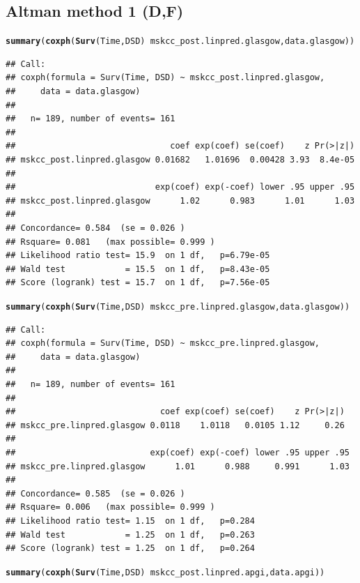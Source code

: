 \documentclass{article}\usepackage[]{graphicx}\usepackage[]{color}
\makeatletter
\newcommand{\hlopt}[1]{\textcolor[rgb]{0,0,0}{#1}}%
\newcommand{\hlstd}[1]{\textcolor[rgb]{0.345,0.345,0.345}{#1}}%
\newcommand{\hlkwd}[1]{\textcolor[rgb]{0.737,0.353,0.396}{\textbf{#1}}}%
\newenvironment{kframe}{%
 \def\at@end@of@kframe{}%
 \ifinner\ifhmode%
  \def\at@end@of@kframe{\end{minipage}}%
  \begin{minipage}{\columnwidth}%
 \fi\fi%
 \def\FrameCommand##1{\hskip\@totalleftmargin \hskip-\fboxsep
 \colorbox{shadecolor}{##1}\hskip-\fboxsep
     \hskip-\linewidth \hskip-\@totalleftmargin \hskip\columnwidth}%
 \MakeFramed {\advance\hsize-\width
   \@totalleftmargin\z@ \linewidth\hsize
   \@setminipage}}%
 {\par\unskip\endMakeFramed%
 \at@end@of@kframe}
\newenvironment{knitrout}{}{} %
\makeatother
\begin{document}
\subsection{Altman method 1 (D,F)}
\begin{knitrout}
\color{fgcolor}\begin{kframe}
\begin{alltt}
\hlkwd{summary}\hlstd{(}\hlkwd{coxph}\hlstd{(}\hlkwd{Surv}\hlstd{(Time, DSD)} \hlopt{~} \hlstd{mskcc_post.linpred.glasgow, data.glasgow))}
\end{alltt}
\begin{verbatim}
## Call:
## coxph(formula = Surv(Time, DSD) ~ mskcc_post.linpred.glasgow, 
##     data = data.glasgow)
## 
##   n= 189, number of events= 161 
## 
##                               coef exp(coef) se(coef)    z Pr(>|z|)
## mskcc_post.linpred.glasgow 0.01682   1.01696  0.00428 3.93  8.4e-05
## 
##                            exp(coef) exp(-coef) lower .95 upper .95
## mskcc_post.linpred.glasgow      1.02      0.983      1.01      1.03
## 
## Concordance= 0.584  (se = 0.026 )
## Rsquare= 0.081   (max possible= 0.999 )
## Likelihood ratio test= 15.9  on 1 df,   p=6.79e-05
## Wald test            = 15.5  on 1 df,   p=8.43e-05
## Score (logrank) test = 15.7  on 1 df,   p=7.56e-05
\end{verbatim}
\begin{alltt}
\hlkwd{summary}\hlstd{(}\hlkwd{coxph}\hlstd{(}\hlkwd{Surv}\hlstd{(Time, DSD)} \hlopt{~} \hlstd{mskcc_pre.linpred.glasgow, data.glasgow))}
\end{alltt}
\begin{verbatim}
## Call:
## coxph(formula = Surv(Time, DSD) ~ mskcc_pre.linpred.glasgow, 
##     data = data.glasgow)
## 
##   n= 189, number of events= 161 
## 
##                             coef exp(coef) se(coef)    z Pr(>|z|)
## mskcc_pre.linpred.glasgow 0.0118    1.0118   0.0105 1.12     0.26
## 
##                           exp(coef) exp(-coef) lower .95 upper .95
## mskcc_pre.linpred.glasgow      1.01      0.988     0.991      1.03
## 
## Concordance= 0.585  (se = 0.026 )
## Rsquare= 0.006   (max possible= 0.999 )
## Likelihood ratio test= 1.15  on 1 df,   p=0.284
## Wald test            = 1.25  on 1 df,   p=0.263
## Score (logrank) test = 1.25  on 1 df,   p=0.264
\end{verbatim}
\begin{alltt}
\hlkwd{summary}\hlstd{(}\hlkwd{coxph}\hlstd{(}\hlkwd{Surv}\hlstd{(Time, DSD)} \hlopt{~} \hlstd{mskcc_post.linpred.apgi, data.apgi))}

\end{alltt}
\end{kframe}
\end{knitrout}
\end{document}
